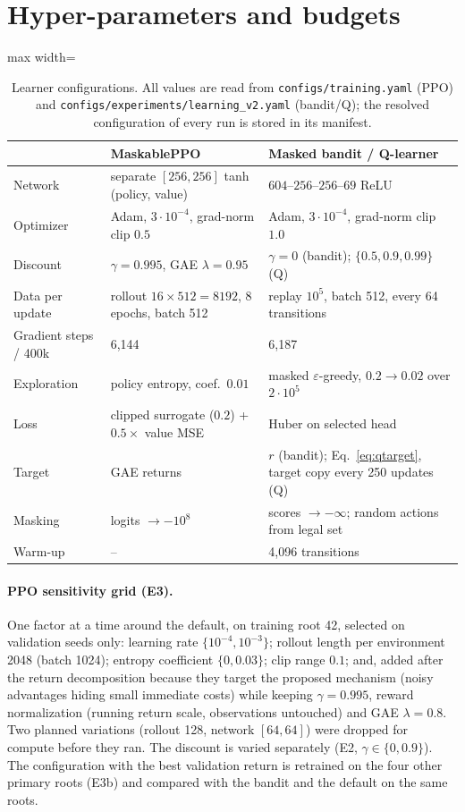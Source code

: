 \section{Hyper-parameters and budgets}
\label{app:hyper}

\begin{table}[h]
\centering\small
\caption{Learner configurations. All values are read from
\texttt{configs/training.yaml} (PPO) and \texttt{configs/experiments/learning\_v2.yaml}
(bandit/Q); the resolved configuration of every run is stored in its manifest.}
\label{tab:hyper}
\begin{adjustbox}{max width=\linewidth}
\begin{tabular}{@{}lll@{}}
\toprule
 & MaskablePPO & Masked bandit / Q-learner \\
\midrule
Network & separate $[256,256]$ tanh (policy, value) & $604$--$256$--$256$--$69$ ReLU \\
Optimizer & Adam, $3\cdot10^{-4}$, grad-norm clip $0.5$ & Adam, $3\cdot10^{-4}$, grad-norm clip $1.0$ \\
Discount & $\gamma=0.995$, GAE $\lambda=0.95$ & $\gamma=0$ (bandit); $\{0.5,0.9,0.99\}$ (Q) \\
Data per update & rollout $16\times512=8192$, 8 epochs, batch 512 & replay $10^5$, batch 512, every 64 transitions \\
Gradient steps / 400k & 6{,}144 & 6{,}187 \\
Exploration & policy entropy, coef.\ $0.01$ & masked $\varepsilon$-greedy, $0.2\to0.02$ over $2\cdot10^5$ \\
Loss & clipped surrogate ($0.2$) + $0.5\times$ value MSE & Huber on selected head \\
Target & GAE returns & $r$ (bandit); Eq.~\eqref{eq:qtarget}, target copy every 250 updates (Q) \\
Masking & logits $\to-10^8$ & scores $\to-\infty$; random actions from legal set \\
Warm-up & -- & 4{,}096 transitions \\
\bottomrule
\end{tabular}
\end{adjustbox}
\end{table}

\paragraph{PPO sensitivity grid (E3).} One factor at a time around the
default, on training root 42, selected on validation seeds only: learning rate
$\{10^{-4},10^{-3}\}$; rollout length per environment 2048 (batch 1024);
entropy coefficient $\{0, 0.03\}$; clip range $0.1$; and, added after the
return decomposition because they target the proposed mechanism (noisy
advantages hiding small immediate costs) while keeping $\gamma=0.995$, reward
normalization (running return scale, observations untouched) and GAE
$\lambda=0.8$. Two planned variations (rollout 128, network $[64,64]$) were
dropped for compute before they ran. The discount is varied separately (E2,
$\gamma\in\{0,0.9\}$). The configuration with the best validation return is
retrained on the four other primary roots (E3b) and compared with the bandit
and the default on the same roots.

